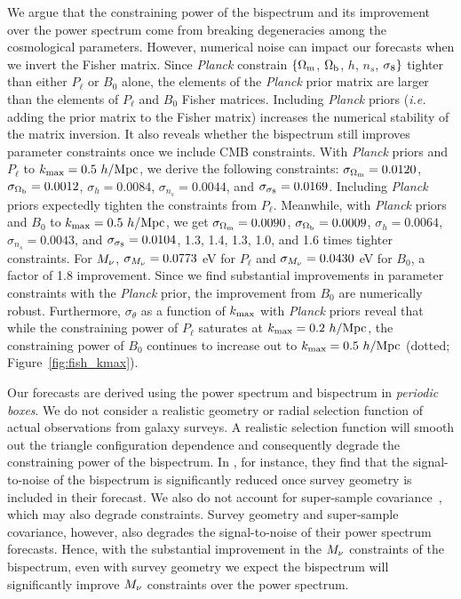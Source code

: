 We argue that the constraining power of the bispectrum and its improvement 
over the power spectrum come from breaking degeneracies among the cosmological 
parameters. However, numerical noise can impact our forecasts when we invert 
the Fisher matrix. Since {\em Planck} constrain $\{\Omega_{\rm m}$, $\Omega_{\rm b}$, $h$, $n_s$, $\sigma_8\}$ 
tighter than either $P_\ell$ or $B_0$ alone, the elements of the {\em Planck} prior 
matrix are larger than the elements of $P_\ell$ and $B_0$ Fisher matrices. 
Including {\em Planck} priors (\emph{i.e.} adding the prior matrix to the 
Fisher matrix) increases the numerical stability of the matrix inversion. 
It also reveals whether the bispectrum still improves parameter constraints 
once we include CMB constraints. With {\em Planck} priors and $P_\ell$ to 
$k_{\rm max} = 0.5~h/{\rm Mpc}$, we derive the following constraints: 
$\sigma_{\Omega_{\rm m}} = 0.0120$, $\sigma_{\Omega_{\rm b}} = 0.0012$, $\sigma_h=0.0084$, 
$\sigma_{n_s}=0.0044$, and $\sigma_{\sigma_8}=0.0169$. 
Including {\em Planck} priors expectedly tighten the constraints from $P_\ell$. 
Meanwhile, with {\em Planck} priors and $B_0$ to $k_{\rm max} = 0.5~h/{\rm Mpc}$, we get 
$\sigma_{\Omega_{\rm m}} = 0.0090$, $\sigma_{\Omega_{\rm b}} = 0.0009$, $\sigma_h=0.0064$, 
$\sigma_{n_s}=0.0043$, and $\sigma_{\sigma_8}=0.0104$, 1.3, 1.4, 1.3, 1.0, and 1.6
times tighter constraints. For $M_\nu$, $\sigma_{M_\nu} = 0.0773$ eV for $P_\ell$ 
and $\sigma_{M_\nu} = 0.0430$ eV for $B_0$, a factor of 1.8 improvement. Since we find
substantial improvements in parameter constraints with the {\em Planck} prior, 
the improvement from $B_0$ are numerically robust. Furthermore, $\sigma_\theta$ 
as a function of $k_{\rm max}$ with {\em Planck} priors reveal that while the 
constraining power of $P_\ell$ saturates at $k_{\rm max} = 0.2~h/{\rm Mpc}$, the constraining 
power of $B_0$ continues to increase out to $k_{\rm max} = 0.5~h/{\rm Mpc}$ 
(dotted; Figure~\ref{fig:fish_kmax}). 

Our forecasts are derived using the power spectrum and bispectrum in
\emph{periodic boxes}. We do not consider a realistic geometry or radial selection 
function of actual observations from galaxy 
surveys. A realistic selection function will smooth out the triangle 
configuration dependence and consequently degrade the constraining power 
of the bispectrum. In \cite{sefusatti2005}, for instance, they find that the 
signal-to-noise of the bispectrum is significantly reduced once survey geometry 
is included in their forecast. We also do not account for super-sample 
covariance~\citep[\emph{e.g.}][]{hamilton2006, sefusatti2006, takada2013, li2018}, 
which may also degrade constraints. Survey geometry and super-sample covariance, 
however, also degrades the signal-to-noise of their power spectrum forecasts. 
Hence, with the substantial improvement in the $M_\nu$ constraints of the bispectrum, 
even with survey geometry we expect the bispectrum will significantly improve 
$M_\nu$ constraints over the power spectrum.  

